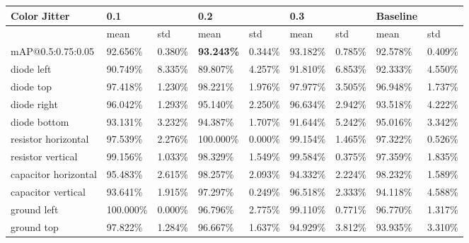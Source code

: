 
\begin{table}[H]
\scriptsize %
\begin{center}
\begin{tabular}{|l|l|l|l|l|l|l|l|l|}
\hline
Color Jitter                    & 0.1      &          & 0.2      &          & 0.3      &          & Baseline &              \\
\hline
                                & mean     & std      & mean     & std      & mean     & std      & mean     & std          \\
\hline
mAP@0.5:0.75:0.05               & 92.656\%  & 0.380\% & \textbf{93.243\%}  & 0.344\% & 93.182\% & 0.785\%  & 92.578\%  & 0.409\%   \\
\hline
\rowcolor{lightgray!50}
diode left                      & 90.749\%  & 8.335\% & 89.807\%  & 4.257\% & 91.810\% & 6.853\%  & 92.333\%  & 4.550\%   \\
diode top                       & 97.418\%  & 1.230\% & 98.221\%  & 1.976\% & 97.977\% & 3.505\%  & 96.948\%  & 1.737\%   \\
\rowcolor{lightgray!50}
diode right                     & 96.042\%  & 1.293\% & 95.140\%  & 2.250\% & 96.634\% & 2.942\%  & 93.518\%  & 4.222\%   \\
diode bottom                    & 93.131\%  & 3.232\% & 94.387\%  & 1.707\% & 91.644\% & 5.242\%  & 95.016\%  & 3.342\%   \\
\rowcolor{lightgray!50}
resistor horizontal             & 97.539\%  & 2.276\% & 100.000\% & 0.000\% & 99.154\% & 1.465\%  & 97.322\%  & 0.526\%   \\
resistor vertical               & 99.156\%  & 1.033\% & 98.329\%  & 1.549\% & 99.584\% & 0.375\%  & 97.359\%  & 1.835\%   \\
\rowcolor{lightgray!50}
capacitor horizontal            & 95.483\%  & 2.615\% & 98.257\%  & 2.093\% & 94.332\% & 2.224\%  & 98.232\%  & 1.589\%   \\
capacitor vertical              & 93.641\%  & 1.915\% & 97.297\%  & 0.249\% & 96.518\% & 2.333\%  & 94.118\%  & 4.588\%   \\
\rowcolor{lightgray!50}
ground left                     & 100.000\% & 0.000\% & 96.796\%  & 2.775\% & 99.110\% & 0.771\%  & 96.770\%  & 1.317\%   \\
ground top                      & 97.822\%  & 1.284\% & 96.667\%  & 1.637\% & 94.929\% & 3.812\%  & 93.935\%  & 3.310\%   \\

\end{tabular}
\end{center}
\end{table}

